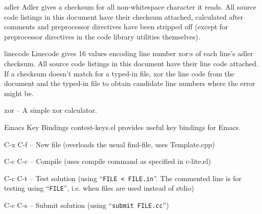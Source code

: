 \begin{algorithm}{adler}
\desc
Adler gives a checksum for all non-whitespace character it reads.
All source code listings in this document have their checksum attached,
calculated after comments and preprocessor directives have been stripped off
(except for preprocessor directives in the code library utilities themselves).
\end{algorithm}


\begin{algorithm}{linecode}
\desc
Linecode gives 16 values encoding line number xor:s of each line's adler
checksum. All source code listings in this document have their line code
attached. If a checksum doesn't match for a typed-in file, xor the line code
from the document and the typed-in file to obtain candidate line numbers where
the error might be.
\end{algorithm}

\begin{algorithm}{xor}
 -- A simple xor calculator.
\end{algorithm}

\begin{algorithm}{Emacs Key Bindings}
contest-keys.el provides useful key bindings for Emacs.
\begin{description}
\item{C-x C-f} -- New file (overloads the usual find-file, uses Template.cpp)
\item{C-c C-c} -- Compile (uses compile command as specified in c-lite.el)
\item{C-c C-t} -- Test solution (using ``\texttt{FILE < FILE.in}''. The
commented line is for testing using ``\texttt{FILE}'', i.e. when files
are used instead of stdio)
\item{C-c C-s} -- Submit solution (using ``\texttt{submit FILE.cc}'')
\end{description}
\end{algorithm}


